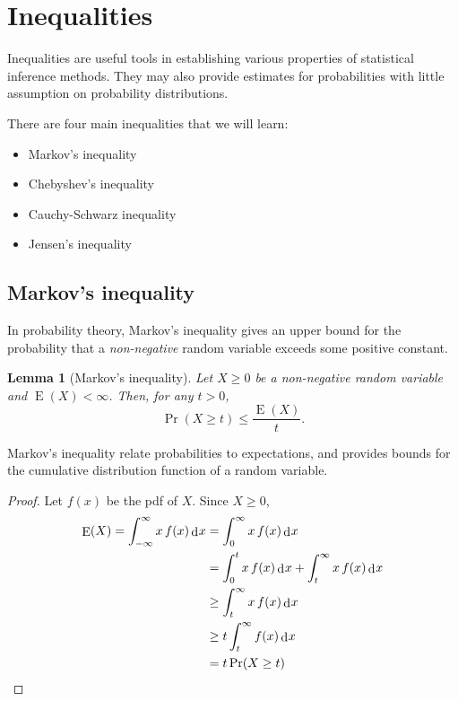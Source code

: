\documentclass[
]{book}
\providecommand{\tightlist}{%
  \setlength{\itemsep}{0pt}\setlength{\parskip}{0pt}}
\DeclareMathOperator{\E}{E}
\DeclareMathOperator{\dd}{d}
\newcommand{\dint}{\dd\hspace{0.5pt}\!}
\newtheorem{lemma}{Lemma}[chapter]
\theoremstyle{definition}
\theoremstyle{definition}
\theoremstyle{definition}
\theoremstyle{definition}
\theoremstyle{remark}
\begin{document}
\hypertarget{inequalities}{%
\section{Inequalities}\label{inequalities}}

Inequalities are useful tools in establishing various properties of statistical inference methods.
They may also provide estimates for probabilities with little assumption on probability distributions.

There are four main inequalities that we will learn:

\begin{itemize}
\tightlist
\item
  Markov's inequality
\item
  Chebyshev's inequality
\item
  Cauchy-Schwarz inequality
\item
  Jensen's inequality
\end{itemize}

\hypertarget{markovs-inequality}{%
\subsection{Markov's inequality}\label{markovs-inequality}}

In probability theory, Markov's inequality gives an upper bound for the
probability that a \emph{non-negative} random variable exceeds some positive constant.

\begin{lemma}[Markov's inequality]
Let \(X\geq 0\) be a non-negative random variable and \(\E(X) < \infty\). Then, for any
\(t>0\), \[\Pr(X\geq t) \leq \frac{\E(X)}{t}.\]
\end{lemma}

Markov's inequality relate probabilities to expectations, and provides
bounds for the cumulative distribution function of a random variable.

\begin{proof}
Let \(f(x)\) be the pdf of \(X\). Since \(X\geq 0\), \[\begin{aligned}
    \E(X) = \int_{-\infty}^{\infty} x\,f(x) \dint x &= \int_0^{\infty} x\,f(x) \dint x \\
    &= \int_0^t x\,f(x) \dint x + \int_t^\infty x\,f(x) \dint x \\
    &\geq \int_t^\infty x\,f(x) \dint x \\
    &\geq t\int_t^\infty f(x) \dint x \\
    &= t\Pr(X\geq t) 
  \end{aligned}\]
\end{proof}
\end{document}

